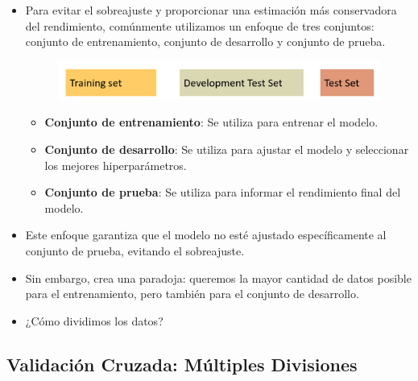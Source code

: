 \documentclass[11pt,fleqn]{book} %
\begin{document}
\begin{itemize}
 \item Para evitar el sobreajuste y proporcionar una estimación más conservadora del rendimiento, comúnmente utilizamos un enfoque de tres conjuntos: conjunto de entrenamiento, conjunto de desarrollo y conjunto de prueba.
\begin{figure}[h]
\includegraphics[scale = 0.23]{pics/devsets.png}
\end{figure}

\begin{itemize}
\item \textbf{Conjunto de entrenamiento}: Se utiliza para entrenar el modelo.
\item \textbf{Conjunto de desarrollo}: Se utiliza para ajustar el modelo y seleccionar los mejores hiperparámetros.
\item \textbf{Conjunto de prueba}: Se utiliza para informar el rendimiento final del modelo.
\end{itemize}

\item Este enfoque garantiza que el modelo no esté ajustado específicamente al conjunto de prueba, evitando el sobreajuste.
\item Sin embargo, crea una paradoja: queremos la mayor cantidad de datos posible para el entrenamiento, pero también para el conjunto de desarrollo.
\item ¿Cómo dividimos los datos?

\end{itemize}





\subsection{Validación Cruzada: Múltiples Divisiones}
\end{document}
